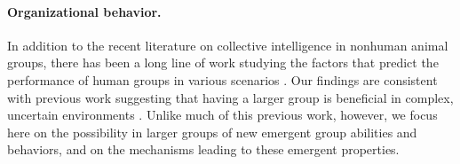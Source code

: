 \documentclass[12pt,letterpaper]{article}
\begin{document}

\paragraph{Organizational behavior.}

In addition to the recent literature on collective intelligence in nonhuman animal groups, there has been a long line of work studying the factors that predict the performance of human groups in various scenarios \cite{kerr_group_2004,lazer2007network,mason2012collaborative,malone2015handbook,shore2015facts}.  
Our findings are consistent with previous work suggesting that having a larger group is beneficial in complex, uncertain environments \cite{stewart_meta-analytic_2006}.  
Unlike much of this previous work, however, we focus here on the possibility in larger groups of new emergent group abilities and behaviors, and on the mechanisms leading to these emergent properties.
\end{document}
